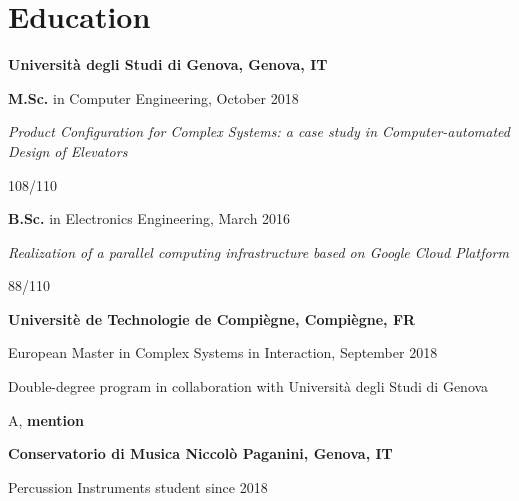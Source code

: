 \section{\sc Education}
{\bf Universit\`a degli Studi di Genova, Genova, IT}
\begin{list1}
\item[] \textbf{M.Sc.} in Computer Engineering, October 2018
\item[] \textit{Product Configuration for Complex Systems: a case study
	in Computer-automated Design of Elevators}
\item[] 108/110
\end{list1}
\begin{list1}
	\item[] \textbf{B.Sc.} in Electronics Engineering, March 2016
	\item[] \textit{Realization of a parallel computing infrastructure 
		based on Google Cloud Platform}
	\item[] 88/110
\end{list1}

{\bf Universit\`e de Technologie de Compi\`egne, Compi\`egne, FR}
\begin{list1}
	\item[] European Master in Complex Systems in Interaction, September 2018
	\item[] Double-degree program in collaboration with Universit\`a 
	degli Studi di Genova
	\item[] A, \textbf{mention}
\end{list1}

{\bf Conservatorio di Musica Niccol\`o Paganini, Genova, IT}
\begin{list1}
	\item[] Percussion Instruments student since 2018
\end{list1}